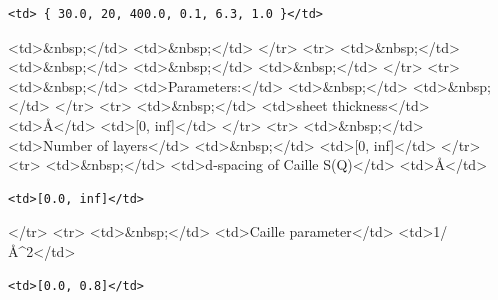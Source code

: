 \begin{verbatim}
<td> { 30.0, 20, 400.0, 0.1, 6.3, 1.0 }</td>
\end{verbatim}

\textless{}td\textgreater{}\&nbsp;\textless{}/td\textgreater{} \textless{}td\textgreater{}\&nbsp;\textless{}/td\textgreater{} \textless{}/tr\textgreater{} \textless{}tr\textgreater{} \textless{}td\textgreater{}\&nbsp;\textless{}/td\textgreater{} \textless{}td\textgreater{}\&nbsp;\textless{}/td\textgreater{} \textless{}td\textgreater{}\&nbsp;\textless{}/td\textgreater{} \textless{}td\textgreater{}\&nbsp;\textless{}/td\textgreater{} \textless{}/tr\textgreater{} \textless{}tr\textgreater{} \textless{}td\textgreater{}\&nbsp;\textless{}/td\textgreater{} \textless{}td\textgreater{}Parameters:\textless{}/td\textgreater{} \textless{}td\textgreater{}\&nbsp;\textless{}/td\textgreater{} \textless{}td\textgreater{}\&nbsp;\textless{}/td\textgreater{} \textless{}/tr\textgreater{} \textless{}tr\textgreater{} \textless{}td\textgreater{}\&nbsp;\textless{}/td\textgreater{} \textless{}td\textgreater{}sheet thickness\textless{}/td\textgreater{} \textless{}td\textgreater{}\AA{}\textless{}/td\textgreater{} \textless{}td\textgreater{}[0, inf]\textless{}/td\textgreater{} \textless{}/tr\textgreater{} \textless{}tr\textgreater{} \textless{}td\textgreater{}\&nbsp;\textless{}/td\textgreater{} \textless{}td\textgreater{}Number of layers\textless{}/td\textgreater{} \textless{}td\textgreater{}\&nbsp;\textless{}/td\textgreater{} \textless{}td\textgreater{}[0, inf]\textless{}/td\textgreater{} \textless{}/tr\textgreater{} \textless{}tr\textgreater{} \textless{}td\textgreater{}\&nbsp;\textless{}/td\textgreater{} \textless{}td\textgreater{}d-spacing of Caille S(Q)\textless{}/td\textgreater{} \textless{}td\textgreater{}\AA{}\textless{}/td\textgreater{}

\begin{verbatim}
<td>[0.0, inf]</td>
\end{verbatim}

\textless{}/tr\textgreater{} \textless{}tr\textgreater{} \textless{}td\textgreater{}\&nbsp;\textless{}/td\textgreater{} \textless{}td\textgreater{}Caille parameter\textless{}/td\textgreater{} \textless{}td\textgreater{}1/\AA{}\textasciicircum{}2\textless{}/td\textgreater{}

\begin{verbatim}
<td>[0.0, 0.8]</td>
\end{verbatim}

